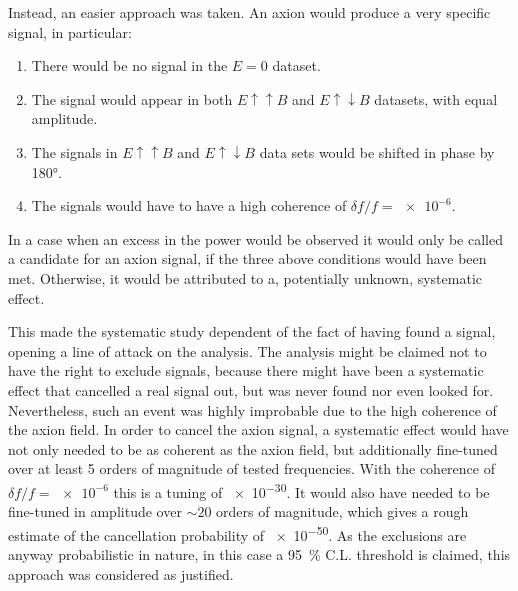 Instead, an easier approach was taken. An axion would produce a very specific signal, in particular:
\begin{enumerate}
  \item There would be no signal in the $E=0$ dataset.
  \item The signal would appear in both $E \uparrow \uparrow B$ and $E \uparrow \downarrow B$ datasets, with equal amplitude.
  \item The signals in $E \uparrow \uparrow B$ and $E \uparrow \downarrow B$ data sets would be shifted in phase by \ang{180}.
  \item The signals would have to have a high coherence of $\delta f / f = \num{e-6}$.
\end{enumerate}
In a case when an excess in the power would be observed it would only be called a candidate for an axion signal, if the three above conditions would have been met. Otherwise, it would be attributed to a, potentially unknown, systematic effect.

This made the systematic study dependent of the fact of having found a signal, opening a line of attack on the analysis. The analysis might be claimed not to have the right to exclude signals, because there might have been a systematic effect that cancelled a real signal out, but was never found nor even looked for. Nevertheless, such an event was highly improbable due to the high coherence of the axion field. In order to cancel the axion signal, a systematic effect would have not only needed to be as coherent as the axion field, but additionally fine-tuned over at least 5 orders of magnitude of tested frequencies. With the coherence of $\delta f / f = \num{e-6}$ this is a tuning of \num{e-30}. It would also have needed to be fine-tuned in amplitude over $\sim 20$ orders of magnitude, which gives a rough estimate of the cancellation probability of \num{e-50}. As the exclusions are anyway probabilistic in nature, in this case a \SI{95}{\percent} C.L. threshold is claimed, this approach was considered as justified.





